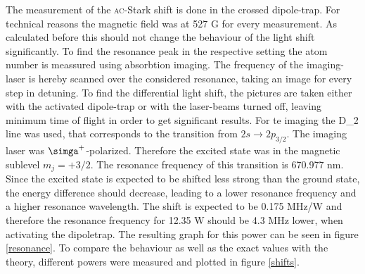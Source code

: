 The measurement of the \textsc{ac}-Stark shift is done in the crossed dipole-trap. For technical reasons the magnetic field was at 527 G for every measurement. As calculated before this should not change the behaviour of the light shift significantly. To find the resonance peak in the respective setting the atom number is meassured using absorbtion imaging. The frequency of the imaging-laser is hereby scanned over the considered resonance, taking an image for every step in detuning. To find the differential light shift, the pictures are taken either with the activated dipole-trap or with the laser-beams turned off, leaving minimum time of flight in order to get significant results. For te imaging the D_2 line was used, that corresponds to the transition from  $2s\rightarrow2p_{3/2}$. The imaging laser was $\simga^+$-polarized. Therefore the excited state was in the magnetic sublevel $m_j=+3/2$. The resonance frequency of this transition is 670.977 nm. Since the excited state is expected to be shifted less strong than the ground state, the energy difference should decrease, leading to a lower resonance frequency and a higher resonance wavelength. The shift is expected to be 0.175 MHz/W and therefore the resonance frequency for 12.35 W should be 4.3 MHz lower, when activating the dipoletrap. The resulting graph for this power can be seen in figure \ref{resonance}. To compare the behaviour as well as the exact values with the theory, different powers were measured and plotted in figure \ref{shifts}. 

